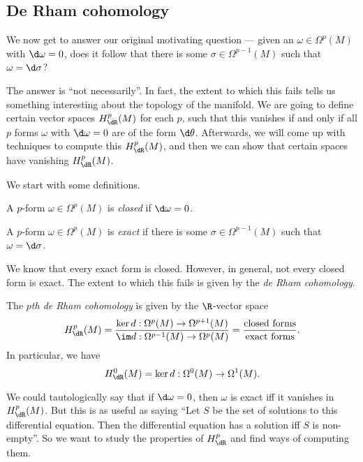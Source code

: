 \documentclass[a4paper]{article}
\begin{document}
\subsection{De Rham cohomology}
We now get to answer our original motivating question --- given an $\omega \in \Omega^p(M)$ with $\d \omega = 0$, does it follow that there is some $\sigma \in \Omega^{p - 1}(M)$ such that $\omega = \d \sigma$?

The answer is ``not necessarily''. In fact, the extent to which this fails tells us something interesting about the topology of the manifold. We are going to define certain vector spaces $H^p_{\dR}(M)$ for each $p$, such that this vanishes if and only if all $p$ forms $\omega$ with $\d \omega = 0$ are of the form $\d \theta$. Afterwards, we will come up with techniques to compute this $H^p_{\dR}(M)$, and then we can show that certain spaces have vanishing $H^p_{\dR}(M)$.

We start with some definitions.

\begin{defi}
  A $p$-form $\omega \in \Omega^p(M)$ is \emph{closed} if $\d \omega = 0$.
\end{defi}

\begin{defi}
  A $p$-form $\omega \in \Omega^p(M)$ is \emph{exact} if there is some $\sigma \in \Omega^{p - 1}(M)$ such that $\omega = \d \sigma$.
\end{defi}

We know that every exact form is closed. However, in general, not every closed form is exact. The extent to which this fails is given by the \emph{de Rham cohomology}.

\begin{defi}
  The \emph{$p$th de Rham cohomology} is given by the $\R$-vector space
  \[
    H^p_\dR (M) = \frac{\ker d: \Omega^p(M) \to \Omega^{p + 1}(M)}{\im d: \Omega^{p - 1}(M) \to \Omega^p(M)} = \frac{\text{closed forms}}{\text{exact forms}}.
  \]
  In particular, we have
  \[
    H^0_{\dR}(M) = \ker d: \Omega^0(M) \to \Omega^1(M).
  \]
\end{defi}

We could tautologically say that if $\d \omega = 0$, then $\omega$ is exact iff it vanishes in $H^p_{\dR}(M)$. But this is as useful as saying ``Let $S$ be the set of solutions to this differential equation. Then the differential equation has a solution iff $S$ is non-empty''. So we want to study the properties of $H^p_{\dR}$ and find ways of computing them.
\end{document}
